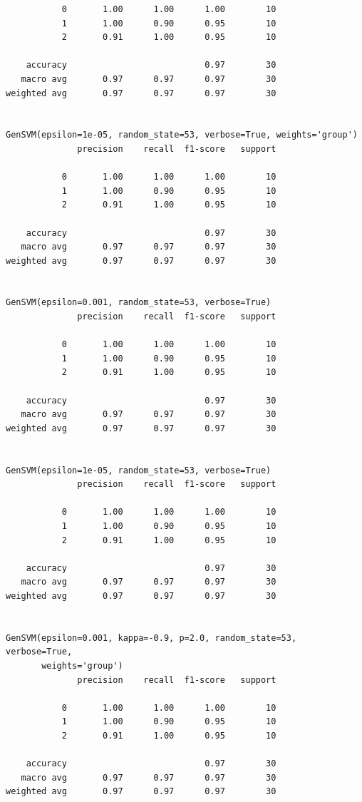 \documentclass{article}
\begin{document}
\begin{LTR}
\begin{verbatim}
           0       1.00      1.00      1.00        10
           1       1.00      0.90      0.95        10
           2       0.91      1.00      0.95        10

    accuracy                           0.97        30
   macro avg       0.97      0.97      0.97        30
weighted avg       0.97      0.97      0.97        30


GenSVM(epsilon=1e-05, random_state=53, verbose=True, weights='group')
              precision    recall  f1-score   support

           0       1.00      1.00      1.00        10
           1       1.00      0.90      0.95        10
           2       0.91      1.00      0.95        10

    accuracy                           0.97        30
   macro avg       0.97      0.97      0.97        30
weighted avg       0.97      0.97      0.97        30


GenSVM(epsilon=0.001, random_state=53, verbose=True)
              precision    recall  f1-score   support

           0       1.00      1.00      1.00        10
           1       1.00      0.90      0.95        10
           2       0.91      1.00      0.95        10

    accuracy                           0.97        30
   macro avg       0.97      0.97      0.97        30
weighted avg       0.97      0.97      0.97        30


GenSVM(epsilon=1e-05, random_state=53, verbose=True)
              precision    recall  f1-score   support

           0       1.00      1.00      1.00        10
           1       1.00      0.90      0.95        10
           2       0.91      1.00      0.95        10

    accuracy                           0.97        30
   macro avg       0.97      0.97      0.97        30
weighted avg       0.97      0.97      0.97        30


GenSVM(epsilon=0.001, kappa=-0.9, p=2.0, random_state=53, verbose=True,
       weights='group')
              precision    recall  f1-score   support

           0       1.00      1.00      1.00        10
           1       1.00      0.90      0.95        10
           2       0.91      1.00      0.95        10

    accuracy                           0.97        30
   macro avg       0.97      0.97      0.97        30
weighted avg       0.97      0.97      0.97        30



\end{verbatim}
\end{LTR}
\end{document}
